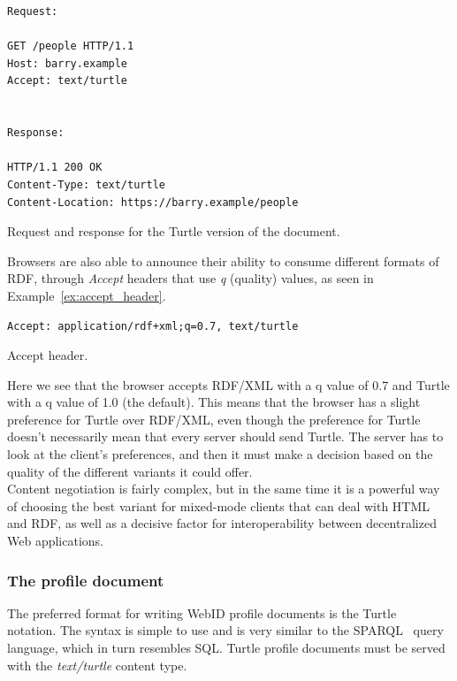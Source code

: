 \begin{example}
\begin{verbatim}
Request:

GET /people HTTP/1.1
Host: barry.example
Accept: text/turtle


Response:

HTTP/1.1 200 OK
Content-Type: text/turtle
Content-Location: https://barry.example/people
\end{verbatim}
\caption{Request and response for the Turtle version of the document.}
\label{ex:http_request}
\end{example}

Browsers are also able to announce their ability to consume different formats of RDF, through \textit{Accept} headers that use \textit{q} (quality) values, as seen in Example~\ref{ex:accept_header}.\\

\begin{example}
\begin{verbatim}
Accept: application/rdf+xml;q=0.7, text/turtle
\end{verbatim}
\caption{Accept header.}
\label{ex:accept_header}
\end{example}

Here we see that the browser accepts RDF/XML with a q value of 0.7 and Turtle with a q value of 1.0 (the default). This means that the browser has a slight preference for Turtle over RDF/XML, even though the preference for Turtle doesn't necessarily mean that every server should send Turtle. The server has to look at the client's preferences, and then it must make a decision based on the quality of the different variants it could offer.\\

Content negotiation is fairly complex, but in the same time it is a powerful way of choosing the best variant for mixed-mode clients that can deal with HTML and RDF, as well as a decisive factor for interoperability between decentralized Web applications.

\subsubsection{The profile document}
The preferred format for writing WebID profile documents is the Turtle~\cite{beckett2008turtle} notation. The syntax is simple to use and is very similar to the SPARQL~\cite{prud2008sparql} query language, which in turn resembles SQL. Turtle profile documents must be served with the \textit{text/turtle} content type.\\

